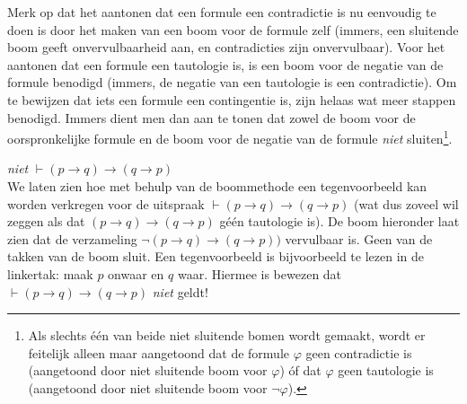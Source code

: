 Merk op dat het aantonen dat een formule een contradictie is nu eenvoudig te doen is door het maken van een boom voor de formule zelf (immers, een sluitende boom geeft onvervulbaarheid aan, en contradicties zijn onvervulbaar). Voor het aantonen dat een formule een tautologie is, is een boom voor de negatie van de formule benodigd (immers, de negatie van een tautologie is een contradictie). Om te bewijzen dat iets een formule een contingentie is, zijn helaas wat meer stappen benodigd. Immers dient men dan aan te tonen dat zowel de boom voor de oorspronkelijke formule en de boom voor de negatie van de formule \textit{niet} sluiten\footnote{Als slechts \'e\'en van beide niet sluitende bomen wordt gemaakt, wordt er feitelijk alleen maar aangetoond dat de formule $\varphi$ geen contradictie is (aangetoond door niet sluitende boom voor $\varphi$) \'of dat $\varphi$ geen tautologie is (aangetoond door niet sluitende boom voor $\neg\varphi$).}.


\begin{example} \textit{niet} $\vdash (p\rightarrow q)\rightarrow(q\rightarrow p)$\\
We laten zien hoe met behulp van de boommethode een tegenvoorbeeld kan worden verkregen voor de uitspraak $\vdash (p\rightarrow q)\rightarrow(q\rightarrow p)$ (wat dus zoveel wil zeggen als dat $(p\rightarrow q)\rightarrow(q\rightarrow p)$ g\'e\'en tautologie is). De boom hieronder laat zien dat de verzameling $\neg(p\rightarrow q)\rightarrow(q\rightarrow p))$ vervulbaar is. Geen van de takken van de boom sluit. Een tegenvoorbeeld is bijvoorbeeld te lezen in de linkertak: maak $p$ onwaar en $q$ waar. Hiermee is bewezen dat $\vdash (p\rightarrow q)\rightarrow(q\rightarrow p)$ \textit{niet} geldt!
\begin{center}
\end{center}
\end{example}

